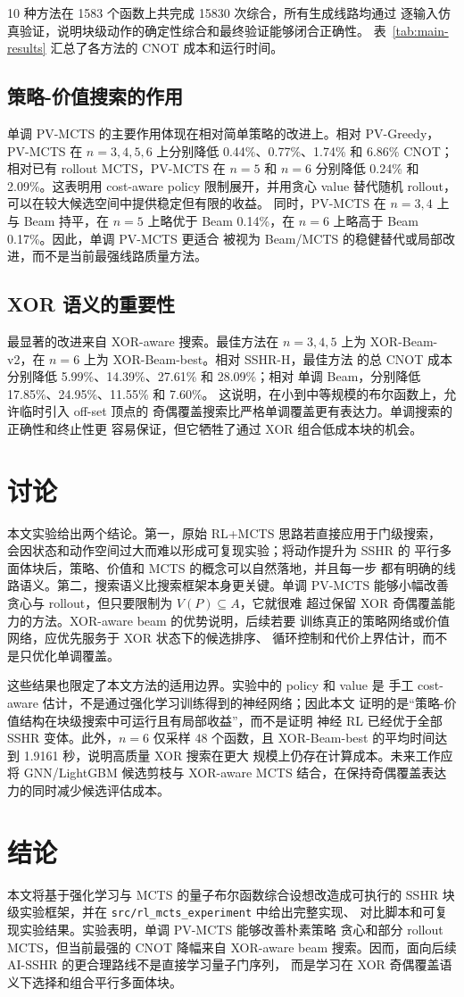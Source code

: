 \documentclass[11pt,letterpaper]{ctexart}
\begin{document}
10 种方法在 1583 个函数上共完成 15830 次综合，所有生成线路均通过
逐输入仿真验证，说明块级动作的确定性综合和最终验证能够闭合正确性。
表~\ref{tab:main-results} 汇总了各方法的 CNOT 成本和运行时间。



\subsection{策略-价值搜索的作用}

单调 PV-MCTS 的主要作用体现在相对简单策略的改进上。相对 PV-Greedy，
PV-MCTS 在 $n=3,4,5,6$ 上分别降低 0.44\%、0.77\%、1.74\% 和 6.86\%
CNOT；相对已有 rollout MCTS，PV-MCTS 在 $n=5$ 和 $n=6$ 分别降低
0.24\% 和 2.09\%。这表明用 cost-aware policy 限制展开，并用贪心
value 替代随机 rollout，可以在较大候选空间中提供稳定但有限的收益。
同时，PV-MCTS 在 $n=3,4$ 上与 Beam 持平，在 $n=5$ 上略优于 Beam
0.14\%，在 $n=6$ 上略高于 Beam 0.17\%。因此，单调 PV-MCTS 更适合
被视为 Beam/MCTS 的稳健替代或局部改进，而不是当前最强线路质量方法。

\subsection{XOR 语义的重要性}

最显著的改进来自 XOR-aware 搜索。最佳方法在 $n=3,4,5$ 上为
XOR-Beam-v2，在 $n=6$ 上为 XOR-Beam-best。相对 SSHR-H，最佳方法
的总 CNOT 成本分别降低 5.99\%、14.39\%、27.61\% 和 28.09\%；相对
单调 Beam，分别降低 17.85\%、24.95\%、11.55\% 和 7.60\%。
这说明，在小到中等规模的布尔函数上，允许临时引入 off-set 顶点的
奇偶覆盖搜索比严格单调覆盖更有表达力。单调搜索的正确性和终止性更
容易保证，但它牺牲了通过 XOR 组合低成本块的机会。

\section{讨论}

本文实验给出两个结论。第一，原始 RL+MCTS 思路若直接应用于门级搜索，
会因状态和动作空间过大而难以形成可复现实验；将动作提升为 SSHR 的
平行多面体块后，策略、价值和 MCTS 的概念可以自然落地，并且每一步
都有明确的线路语义。第二，搜索语义比搜索框架本身更关键。单调 PV-MCTS
能够小幅改善贪心与 rollout，但只要限制为 $V(P)\subseteq A$，它就很难
超过保留 XOR 奇偶覆盖能力的方法。XOR-aware beam 的优势说明，后续若要
训练真正的策略网络或价值网络，应优先服务于 XOR 状态下的候选排序、
循环控制和代价上界估计，而不是只优化单调覆盖。

这些结果也限定了本文方法的适用边界。实验中的 policy 和 value 是
手工 cost-aware 估计，不是通过强化学习训练得到的神经网络；因此本文
证明的是“策略-价值结构在块级搜索中可运行且有局部收益”，而不是证明
神经 RL 已经优于全部 SSHR 变体。此外，$n=6$ 仅采样 48 个函数，且
XOR-Beam-best 的平均时间达到 1.9161 秒，说明高质量 XOR 搜索在更大
规模上仍存在计算成本。未来工作应将 GNN/LightGBM 候选剪枝与 XOR-aware
MCTS 结合，在保持奇偶覆盖表达力的同时减少候选评估成本。

\section{结论}

本文将基于强化学习与 MCTS 的量子布尔函数综合设想改造成可执行的
SSHR 块级实验框架，并在 \texttt{src/rl\_mcts\_experiment} 中给出完整实现、
对比脚本和可复现实验结果。实验表明，单调 PV-MCTS 能够改善朴素策略
贪心和部分 rollout MCTS，但当前最强的 CNOT 降幅来自 XOR-aware beam
搜索。因而，面向后续 AI-SSHR 的更合理路线不是直接学习量子门序列，
而是学习在 XOR 奇偶覆盖语义下选择和组合平行多面体块。
\end{document}
